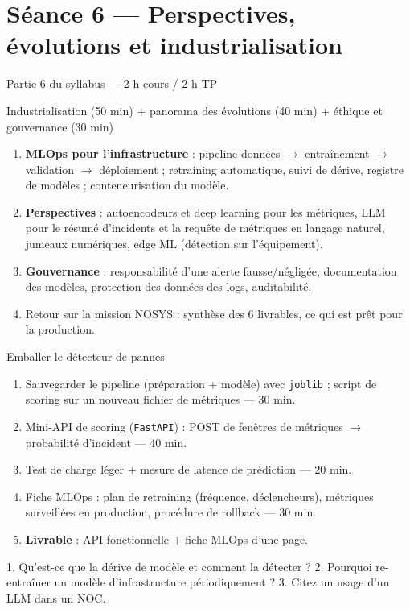 \documentclass[11pt,a4paper]{article}
\begin{document}
\section*{Séance 6 — Perspectives, évolutions et industrialisation}
\begin{seancebox}{Partie 6 du syllabus — 2 h cours / 2 h TP}
\end{seancebox}
\begin{coursbox}{Industrialisation (50 min) + panorama des évolutions (40 min) + éthique et gouvernance (30 min)}
\begin{enumerate}[nosep]
\item \textbf{MLOps pour l'infrastructure} : pipeline données $\to$ entraînement $\to$ validation $\to$ déploiement ; retraining automatique, suivi de dérive, registre de modèles ; conteneurisation du modèle.
\item \textbf{Perspectives} : autoencodeurs et deep learning pour les métriques, LLM pour le résumé d'incidents et la requête de métriques en langage naturel, jumeaux numériques, edge ML (détection sur l'équipement).
\item \textbf{Gouvernance} : responsabilité d'une alerte fausse/négligée, documentation des modèles, protection des données des logs, auditabilité.
\item Retour sur la mission NOSYS : synthèse des 6 livrables, ce qui est prêt pour la production.
\end{enumerate}
\end{coursbox}
\begin{tpbox}{Emballer le détecteur de pannes}
\begin{enumerate}[nosep]
\item Sauvegarder le pipeline (préparation + modèle) avec \texttt{joblib} ; script de scoring sur un nouveau fichier de métriques — 30 min.
\item Mini-API de scoring (\texttt{FastAPI}) : POST de fenêtres de métriques $\to$ probabilité d'incident — 40 min.
\item Test de charge léger + mesure de latence de prédiction — 20 min.
\item Fiche MLOps : plan de retraining (fréquence, déclencheurs), métriques surveillées en production, procédure de rollback — 30 min.
\item \textbf{Livrable} : API fonctionnelle + fiche MLOps d'une page.
\end{enumerate}
\end{tpbox}
\begin{evalbox}
1. Qu'est-ce que la dérive de modèle et comment la détecter ? 2. Pourquoi re-entraîner un modèle d'infrastructure périodiquement ? 3. Citez un usage d'un LLM dans un NOC.
\end{evalbox}
\end{document}
